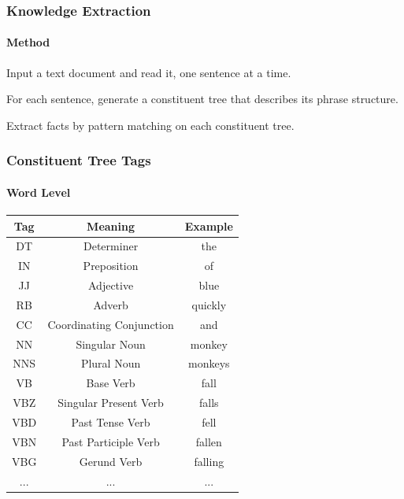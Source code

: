 \documentclass[mathserif]{beamer}
\begin{document}
\begin{frame}

\frametitle{Knowledge Extraction}
\framesubtitle{Method}

\begin{description}[<+->]

\item[Tokenization] Input a text document and read it, one sentence at a time.
\item[Parsing] For each sentence, generate a constituent tree that describes its phrase structure.
\item[Compilation] Extract facts by pattern matching on each constituent tree.

\end{description}

\end{frame}


\begin{frame}

\frametitle{Constituent Tree Tags}
\framesubtitle{Word Level}

\centering

\begin{tabular}{c | c | c}
Tag & Meaning & Example \\
\hline
DT & Determiner & the \\
IN & Preposition & of\\
JJ & Adjective & blue\\
RB & Adverb & quickly\\
CC & Coordinating Conjunction & and \\
NN & Singular Noun & monkey\\
NNS & Plural Noun & monkeys\\
VB & Base Verb & fall\\
VBZ & Singular Present Verb & falls\\
VBD & Past Tense Verb & fell\\
VBN & Past Participle Verb & fallen\\
VBG & Gerund Verb & falling\\
... & ... & ...\\
\end{tabular}

\end{frame}
\end{document}
